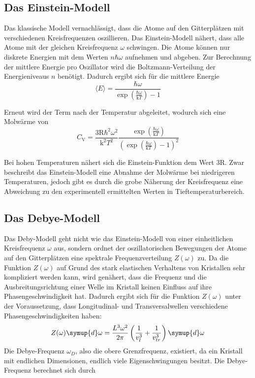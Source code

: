 \subsection{Das Einstein-Modell}
Das klassische Modell vernachlässigt, dass die Atome auf den Gitterplätzen
mit verschiedenen Kreisfrequenzen oszillieren. Das Einstein-Modell nähert,
dass alle Atome mit der gleichen Kreisfrequenz $\omega$ schwingen. Die Atome
können nur diskrete Energien mit dem Werten $n \hbar \omega$ aufnehmen und
abgeben. Zur Berechnung der mittlere Energie pro Oszillator wird die
Boltzmann-Verteilung der Energieniveaus $n$ benötigt. Dadurch ergibt sich
für die mittlere Energie
\begin{equation}
\langle E \rangle =
  \frac{\hbar \omega}{\exp\left(\frac{\hbar \omega}{\text{k} T} \right) -1}
\end{equation}

Erneut wird der Term nach der Temperatur abgeleitet, wodurch sich eine Molwärme
von
\begin{equation}
  C_{\text{V}} = \frac{3 \text{R} \hbar^2 \omega^2}{\text{k}^2 T^2}
  \frac{\exp\left(\frac{\hbar \omega}{\text{k} T}\right)}{\left(\exp\left(\frac{\hbar \omega}{\text{k} T}\right) -1 \right)^2}
\end{equation}

Bei hohen Temperaturen nähert sich die Einstein-Funktion dem Wert $3 \text{R}$.
Zwar beschreibt das Einstein-Modell eine Abnahme der Molwärme bei niedrigeren
Temperaturen, jedoch gibt es durch die grobe Näherung der Kreisfrequenz eine
Abweichung zu den experimentell ermittelten Werten in Tieftemperaturbereich.

\subsection{Das Debye-Modell}
Das Deby-Modell geht nicht wie das Einstein-Modell von einer einheitlichen
Kreisfrequenz $\omega$ aus, sondern ordnet der oszillatorischen Bewegungen
der Atome auf den Gitterplätzen eine spektrale Frequenzverteilung $Z(\omega)$
zu. Da die Funktion $Z(\omega)$ auf Grund des stark elastischen Verhaltens
von Kristallen sehr kompliziert werden kann, wird genähert, dass die Frequenz
und die Ausbreitungsrichtung einer Welle im Kristall keinen Einfluss auf
ihre Phasengeschwindigkeit hat. Dadurch ergibt sich für die Funktion $Z(\omega)$
unter der Voraussetzung, dass Longitudinal- und Transversalwellen verschiedene
Phasengeschwindigkeiten haben:
\begin{equation*}
  Z(\omega) \symup{d} \omega = \frac{L^3 \omega^2}{2 \pi}
  \left(\frac{1}{v_l^3} + \frac{1}{v_{tr}^3} \right) \symup{d}\omega
  \label{eqn:Z}
\end{equation*}
Die Debye-Frequenz $\omega_D$, also die obere Grenzfrequenz, existiert, da ein
Kristall mit endlichen Dimensionen, endlich viele Eigenschwingungen besitzt.
Die Debye-Frequenz
berechnet sich durch

